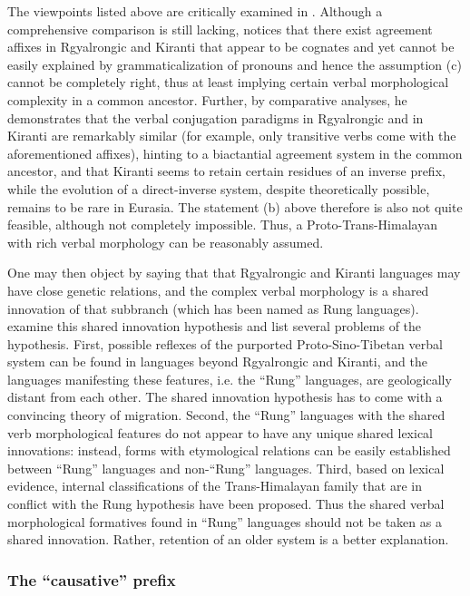 \documentclass[UTF8, a4paper, oneside, scheme=plain, 12pt]{ctexrep}
\begin{document}
The viewpoints listed above are critically examined in \citet{jacques2012agreement}.
Although a comprehensive comparison is still lacking,
\citeauthor{jacques2012agreement} notices that 
there exist agreement affixes in Rgyalrongic and Kiranti that appear to be cognates and yet cannot be easily explained by grammaticalization of pronouns and hence the assumption (c) cannot be completely right,
thus at least implying certain verbal morphological complexity in a common ancestor.
Further, by comparative analyses,
he demonstrates that the verbal conjugation paradigms in Rgyalrongic and in Kiranti are remarkably similar
(for example, only transitive verbs come with the aforementioned affixes),
hinting to a biactantial agreement system in the common ancestor, and 
that Kiranti seems to retain certain residues of an inverse prefix,
while the evolution of a direct-inverse system, despite theoretically possible,
remains to be rare in Eurasia.
The statement (b) above therefore is also not quite feasible, although not completely impossible.
Thus, a Proto-Trans-Himalayan with rich verbal morphology can be reasonably assumed.

One may then object by saying that that Rgyalrongic and Kiranti languages may have close genetic relations, and the complex verbal morphology is a shared innovation of that subbranch (which has been named as Rung languages).
\citet{jacques2021phylogenies} examine this shared innovation hypothesis and list several problems of the hypothesis.
First, possible reflexes of the purported Proto-Sino-Tibetan verbal system can be found in languages beyond Rgyalrongic and Kiranti,
and the languages manifesting these features, i.e. the ``Rung'' languages, are geologically distant from each other.
The shared innovation hypothesis has to come with a convincing theory of migration.
Second, the ``Rung'' languages with the shared verb morphological features
do not appear to have any unique shared lexical innovations:
instead, forms with etymological relations can be easily established between ``Rung'' languages and non-``Rung'' languages.
Third, based on lexical evidence, internal classifications of the Trans-Himalayan family that are in conflict with the Rung hypothesis have been proposed.
Thus the shared verbal morphological formatives found in ``Rung'' languages should not be taken as a shared innovation.
Rather, retention of an older system is a better explanation.

\subsubsection{The ``causative'' prefix}
\end{document}
